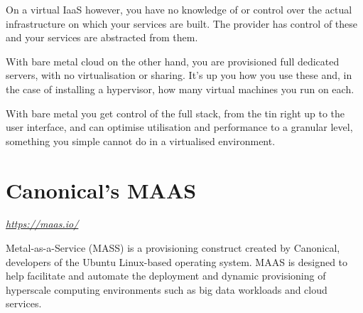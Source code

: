 On a virtual IaaS however, you have no knowledge of or control over the actual infrastructure on which your services are built. The provider has control of these and your services are abstracted from them.

With bare metal cloud on the other hand, you are provisioned full dedicated servers, with no virtualisation or sharing. It's up you how you use these and, in the case of installing a hypervisor, how many virtual machines you run on each.

With bare metal you get control of the full stack, from the tin right up to the user interface, and can optimise utilisation and performance to a granular level, something you simple cannot do in a virtualised environment.

\section{Canonical's MAAS}

\textit{\href{https://maas.io/}{https://maas.io/}}

Metal-as-a-Service (MASS) is a provisioning construct created by Canonical, developers of the Ubuntu Linux-based operating system. MAAS is designed to help facilitate and automate the deployment and dynamic provisioning of hyperscale computing environments such as big data workloads and cloud services.


